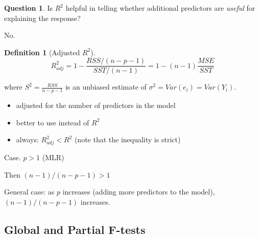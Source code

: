 \documentclass[11pt]{article}
\newenvironment{indentone}{\begin{adjustwidth}{3em}{0em}}{\end{adjustwidth}}
\theoremstyle{definition}
\newtheorem{definition}{Definition}[section]
\newtheorem{question}{Question}[section]
\numberwithin{equation}{section}
\begin{document}
\begin{question}
  Is $R^2$ helpful in telling whether additional predictors are \textit{useful} for explaining the response?

  No.
\end{question}

\begin{definition}[Adjusted $R^2$]
  \begin{equation}
    R^2_{adj} = 1- \frac{RSS/(n-p-1)}{SST/(n-1)} = 1 - (n-1)\frac{MSE}{SST}
  \end{equation}

  where $S^2=\frac{RSS}{n-p-1}$ is an unbiased estimate of $\sigma^2=Var(e_i)=Var(Y_i)$.
  \begin{itemize}
    \item adjusted for the number of predictors in the model
    \item better to use instead of $R^2$
    \item always: $R^2_{adj} < R^2$ (note that the inequality is strict) 
  \end{itemize}
\end{definition}
\begin{writenotes}
  Case. $p > 1$ (MLR)
  \begin{indentone}
    Then $(n-1)/(n-p-1) > 1$
  \end{indentone}
  General case: as $p$ increases (adding more predictors to the model), $(n-1)/(n-p-1)$ increases.
\end{writenotes}

\subsection{Global and Partial F-tests}
\end{document}
